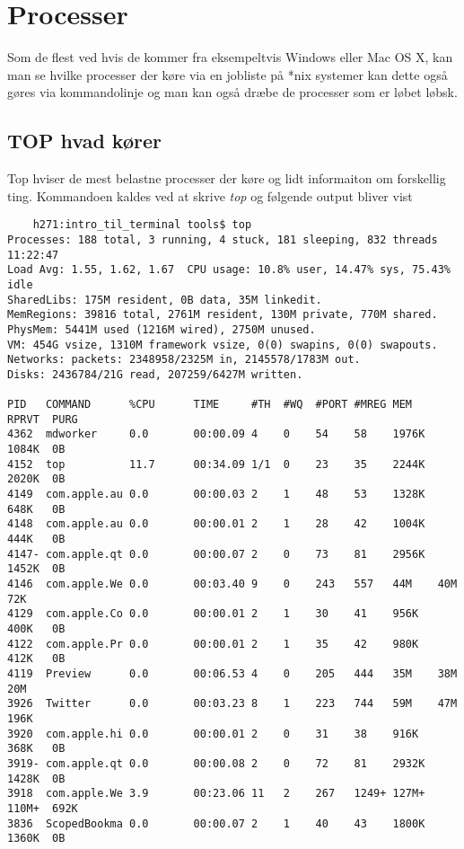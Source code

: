\chapter{Processer}
Som de flest ved hvis de kommer fra eksempeltvis Windows eller Mac OS X, kan man se hvilke processer der køre via en jobliste på *nix systemer kan dette også gøres via kommandolinje og man kan også dræbe de processer som er løbet løbsk.
\section{TOP hvad kører}
Top hviser de mest belastne processer der køre og lidt informaiton om forskellig ting. Kommandoen kaldes ved at skrive \textit{top} og følgende output bliver vist  
\begin{lstlisting}
	h271:intro_til_terminal tools$ top
Processes: 188 total, 3 running, 4 stuck, 181 sleeping, 832 threads    11:22:47
Load Avg: 1.55, 1.62, 1.67  CPU usage: 10.8% user, 14.47% sys, 75.43% idle
SharedLibs: 175M resident, 0B data, 35M linkedit.
MemRegions: 39816 total, 2761M resident, 130M private, 770M shared.
PhysMem: 5441M used (1216M wired), 2750M unused.
VM: 454G vsize, 1310M framework vsize, 0(0) swapins, 0(0) swapouts.
Networks: packets: 2348958/2325M in, 2145578/1783M out.
Disks: 2436784/21G read, 207259/6427M written.

PID   COMMAND      %CPU      TIME     #TH  #WQ  #PORT #MREG MEM    RPRVT  PURG
4362  mdworker     0.0       00:00.09 4    0    54    58    1976K  1084K  0B
4152  top          11.7      00:34.09 1/1  0    23    35    2244K  2020K  0B
4149  com.apple.au 0.0       00:00.03 2    1    48    53    1328K  648K   0B
4148  com.apple.au 0.0       00:00.01 2    1    28    42    1004K  444K   0B
4147- com.apple.qt 0.0       00:00.07 2    0    73    81    2956K  1452K  0B
4146  com.apple.We 0.0       00:03.40 9    0    243   557   44M    40M    72K
4129  com.apple.Co 0.0       00:00.01 2    1    30    41    956K   400K   0B
4122  com.apple.Pr 0.0       00:00.01 2    1    35    42    980K   412K   0B
4119  Preview      0.0       00:06.53 4    0    205   444   35M    38M    20M
3926  Twitter      0.0       00:03.23 8    1    223   744   59M    47M    196K
3920  com.apple.hi 0.0       00:00.01 2    0    31    38    916K   368K   0B
3919- com.apple.qt 0.0       00:00.08 2    0    72    81    2932K  1428K  0B
3918  com.apple.We 3.9       00:23.06 11   2    267   1249+ 127M+  110M+  692K
3836  ScopedBookma 0.0       00:00.07 2    1    40    43    1800K  1360K  0B
\end{lstlisting}
